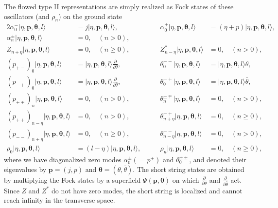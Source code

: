 \documentclass[a4paper,seceq,preprint]{ptptex}
\begin{document}
The flowed type II representations are simply realized as 
Fock states of these oscillators (and $\rho_n$) on the ground state
 \begin{alignat}{2}  
 \alpha^-_0|\eta,\boldsymbol p,\boldsymbol\theta,l\rangle&=
j|\eta,\boldsymbol p,\boldsymbol\theta,l\rangle,&\qquad
 \alpha^+_0|\eta,\boldsymbol p,\boldsymbol\theta,l\rangle&=
(\eta+p)|\eta,\boldsymbol p,\boldsymbol\theta,l\rangle,\nonumber\\
 \alpha^\pm_n|\eta,\boldsymbol p,\boldsymbol\theta,l\rangle&=0,\quad
  (n>0),&&
\nonumber\\
 Z_{n+\eta}|\eta,\boldsymbol p,\boldsymbol\theta,l\rangle&=0,\quad (n\ge 0),&\qquad
 Z^*_{n-\eta}|\eta,\boldsymbol p,\boldsymbol\theta,l\rangle&=0,\quad
  (n>0),
\nonumber\\
 (p_{+-})_0|\eta,\boldsymbol p,\boldsymbol\theta,l\rangle&=
|\eta,\boldsymbol p,\boldsymbol\theta,l\rangle\frac{\partial}{\partial\theta},&\qquad
 \theta^{+-}_0|\eta,\boldsymbol p,\boldsymbol\theta,l\rangle&=
|\eta,\boldsymbol p,\boldsymbol\theta,l\rangle\theta,\nonumber\\
 (p_{-+})_0|\eta,\boldsymbol p,\boldsymbol\theta,l\rangle&=|\eta,\boldsymbol
  p,\boldsymbol\theta,l\rangle\frac{\partial}{\partial\bar\theta},
&\qquad
 \theta^{-+}_0|\eta,\boldsymbol p,\boldsymbol\theta,l\rangle&=
|\eta,\boldsymbol p,\boldsymbol\theta,l\rangle\bar\theta,\nonumber\\
 (p_{\pm\mp})_n|\eta,\boldsymbol p,\boldsymbol\theta,l\rangle&=0,\quad (n> 0),&\qquad
 \theta^{\pm\mp}_n|\eta,\boldsymbol
  p,\boldsymbol\theta,l\rangle&=0,\quad (n>0),
\nonumber\\
 (p_{++})_{n-\eta}|\eta,\boldsymbol p,\boldsymbol\theta,l\rangle&=0,
\quad (n>0),
&\qquad
 \theta^{++}_{n+\eta}|\eta,\boldsymbol p,\boldsymbol\theta,l\rangle&=0,
\quad (n\ge 0),\nonumber\\
 (p_{--})_{n+\eta}|\eta,\boldsymbol p,\boldsymbol\theta,l\rangle&=0,
\quad (n\ge 0),&\qquad
 \theta^{--}_{n-\eta}|\eta,\boldsymbol
  p,\boldsymbol\theta,l\rangle&=0,\quad (n>0),\nonumber\\
 \rho_0|\eta,\boldsymbol p,\boldsymbol\theta,l\rangle&=
(l-\eta)|\eta,\boldsymbol p,\boldsymbol\theta,l\rangle,&\qquad
 \rho_n|\eta,\boldsymbol p,\boldsymbol\theta,l\rangle&=0,\quad (n\ge0),
\label{ffgs}
 \end{alignat}
where we have diagonalized zero modes
$\alpha^\pm_0(=p^\pm)$ and $\theta^{\pm\pm}_0$, 
and denoted their eigenvalues by $\boldsymbol p=(j,p)$ and 
$\boldsymbol\theta=(\theta,\bar\theta)$. 
The short string states are obtained by multiplying the Fock states
by a superfield $\Psi(\boldsymbol p,\boldsymbol\theta)$ on which
$\frac{\partial}{\partial\theta}$ and
$\frac{\partial}{\partial\bar\theta}$ act.
Since $Z$ and $Z^*$ do not have zero modes, the short string 
is localized and cannot reach infinity in the transverse 
space.
\end{document}
